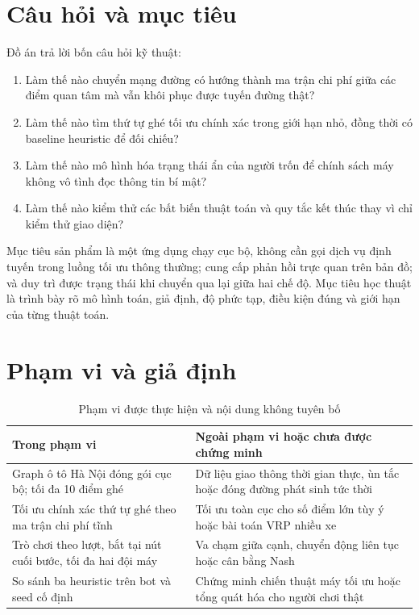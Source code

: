 \section{Câu hỏi và mục tiêu}

Đồ án trả lời bốn câu hỏi kỹ thuật:
\begin{enumerate}
  \item Làm thế nào chuyển mạng đường có hướng thành ma trận chi phí giữa các
  điểm quan tâm mà vẫn khôi phục được tuyến đường thật?
  \item Làm thế nào tìm thứ tự ghé tối ưu chính xác trong giới hạn nhỏ, đồng thời
  có baseline heuristic để đối chiếu?
  \item Làm thế nào mô hình hóa trạng thái ẩn của người trốn để chính sách máy
  không vô tình đọc thông tin bí mật?
  \item Làm thế nào kiểm thử các bất biến thuật toán và quy tắc kết thúc thay vì
  chỉ kiểm thử giao diện?
\end{enumerate}

Mục tiêu sản phẩm là một ứng dụng chạy cục bộ, không cần gọi dịch vụ định tuyến
trong luồng tối ưu thông thường; cung cấp phản hồi trực quan trên bản đồ; và duy
trì được trạng thái khi chuyển qua lại giữa hai chế độ. Mục tiêu học thuật là
trình bày rõ mô hình toán, giả định, độ phức tạp, điều kiện đúng và giới hạn của
từng thuật toán.

\section{Phạm vi và giả định}

\begin{table}[H]
\centering
\caption{Phạm vi được thực hiện và nội dung không tuyên bố}
\begin{tabularx}{\linewidth}{Y Y}
\toprule
\textbf{Trong phạm vi} & \textbf{Ngoài phạm vi hoặc chưa được chứng minh} \\
\midrule
Graph ô tô Hà Nội đóng gói cục bộ; tối đa 10 điểm ghé & Dữ liệu giao thông thời
gian thực, ùn tắc hoặc đóng đường phát sinh tức thời \\
Tối ưu chính xác thứ tự ghé theo ma trận chi phí tĩnh & Tối ưu toàn cục cho số
điểm lớn tùy ý hoặc bài toán VRP nhiều xe \cite{toth2014} \\
Trò chơi theo lượt, bắt tại nút cuối bước, tối đa hai đội máy & Va chạm giữa cạnh,
chuyển động liên tục hoặc cân bằng Nash \\
So sánh ba heuristic trên bot và seed cố định & Chứng minh chiến thuật máy tối ưu
hoặc tổng quát hóa cho người chơi thật \\
\bottomrule
\end{tabularx}
\end{table}

